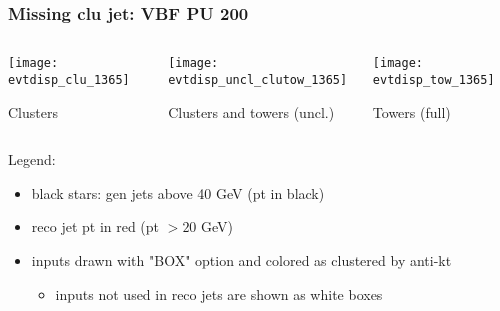 \documentclass[8pt]{beamer}
\begin{document}
  \begin{frame}
  \frametitle{Missing clu jet: VBF PU 200}
  
  \begin{columns}
   \begin{column}{0.4\textwidth}
    \texttt{[image: evtdisp\_clu\_1365]}
    
    \small Clusters
   \end{column}
   \begin{column}{0.4\textwidth}
    \texttt{[image: evtdisp\_uncl\_clutow\_1365]}
    
    \small Clusters and towers (uncl.)
   \end{column}
   \begin{column}{0.4\textwidth}
    \texttt{[image: evtdisp\_tow\_1365]}
    
    \small Towers (full)
   \end{column}
  \end{columns}
  
  \vspace{20pt}

  Legend:
  
  \begin{itemize}
   \item black stars: gen jets above 40 GeV (pt in black)
   \item reco jet pt in red (pt $>20$ GeV)
   \item inputs drawn with "BOX" option and colored as clustered by anti-kt
   \begin{itemize}
    \item inputs not used in reco jets are shown as white boxes
   \end{itemize}
  \end{itemize}

 \end{frame}
 
\end{document}
